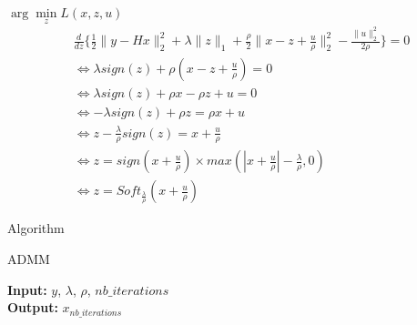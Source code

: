 \begin{frame}{$\arg\min\limits_{z} {L(x, z, u)}$}
\begin{align*}
&\frac{d}{dz} \{
    \frac{1}{2} \lVert y - Hx \rVert_{2}^{2} 
    + \lambda \lVert z \rVert_{1} 
    + \frac{\rho}{2} \lVert x - z + \frac{u}{\rho} \rVert_{2}^{2} 
    - \frac{\lVert u \rVert_{2}^{2}}{2\rho}
\} = 0 \\
&\iff \lambda sign(z) + \rho (x - z + \frac{u}{\rho})  = 0 \\
&\iff \lambda sign(z) + \rho x - \rho z + u  = 0 \\
&\iff -\lambda sign(z) + \rho z  = \rho x + u \\
&\iff  z - \frac{\lambda}{\rho} sign(z) = x + \frac{u}{\rho} \\
&\iff  z = sign(x + \frac{u}{\rho}) 
\times max(|x + \frac{u}{\rho}| 
- \frac{\lambda}{\rho}, 0) \\
&\iff  z = Soft_{\frac{\lambda}{\rho}}(x + \frac{u}{\rho})
\end{align*}
\end{frame}

\begin{frame}{Algorithm}
\begin{algorithm}[H]
    \caption{ADMM} %
    \begin{algorithmic}[1]
        \newline
        \textbf{Input:} $y$, $\lambda$, $\rho$, $nb\_iterations$ \\
        \textbf{Output:} $x_{nb\_iterations}$
        \EndFor
        \EndProcedure
    \end{algorithmic}
\end{algorithm}
\end{frame}